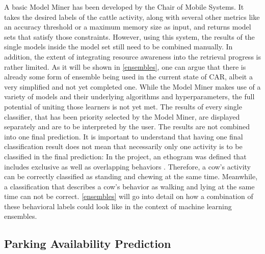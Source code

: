 A basic Model Miner has been developed by the Chair of Mobile Systems. It takes the desired labels of the cattle activity, along with several other metrics like an accuracy threshold or a maximum memory size as input, and returns model sets that satisfy those constraints. However, using this system, the results of the single models inside the model set still need to be combined manually. In addition, the extent of integrating resource awareness into the retrieval progress is rather limited. As it will be shown in \autoref{ensembles}, one can argue that there is already some form of ensemble being used in the current state of CAR, albeit a very simplified and not yet completed one. While the Model Miner makes use of a variety of models and their underlying algorithms and hyperparameters, the full potential of uniting those learners is not yet met. The results of every single classifier, that has been priority selected by the Model Miner, are displayed separately and are to be interpreted by the user. The results are not combined into one final prediction. It is important to understand that having one final classification result does not mean that necessarily only one activity is to be classified in the final prediction: In the project, an ethogram was defined that includes exclusive as well as overlapping behaviors \cite{schmeling2021}. Therefore, a cow's activity can be correctly classified as standing and chewing at the same time. Meanwhile, a classification that describes a cow's behavior as walking and lying at the same time can not be correct. \autoref{ensembles} will go into detail on how a combination of these behavioral labels could look like in the context of machine learning ensembles. 


\subsection{Parking Availability Prediction}\label{PAP}

